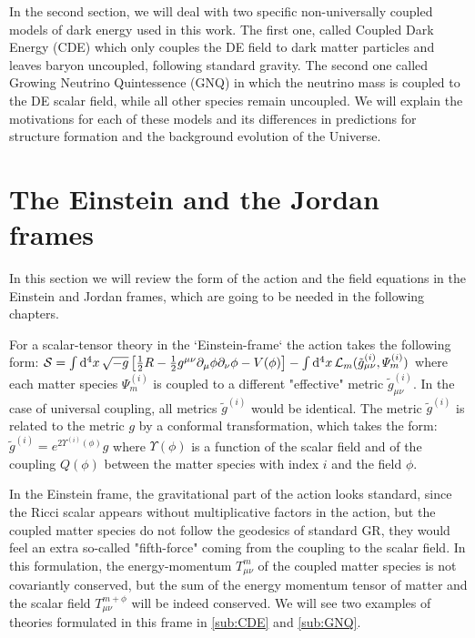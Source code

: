 In the second section, we will deal with two specific non-universally coupled models of dark energy used in this work. 
The first one,
called Coupled Dark Energy (CDE) which only couples the DE field to dark matter particles and leaves baryon uncoupled, following standard
gravity.
The second one called Growing Neutrino Quintessence (GNQ) in which the neutrino mass is coupled to the DE scalar field, while 
all other species remain uncoupled.
We will explain the motivations for each of these models and its differences in predictions for structure formation and the background evolution of the 
Universe.
 
\section{The Einstein and the Jordan frames}

In this section we will review the form of the action and the field equations in the Einstein and Jordan frames, which are going to be needed 
in the following chapters.

For a scalar-tensor theory in the `Einstein-frame` the action takes the following form:
\beeqc$\label{eq:einstein-frame-action}
\mathcal{S} = \int \mathrm{d}^{4} {x} \, \sqrt{-g} \left[  \frac{1}{2} R - \frac{1}{2} g^{\mu \nu}  \partial_{\mu}\phi \partial_{\nu}\phi 
- V(\phi)    \right] - \int \mathrm{d}^{4} {x} \, \mathcal{L}_m (\tilde{g}^{(i)}_{\mu \nu} , \varPsi_m^{(i)} )
$
where each matter species $\varPsi_m^{(i)}$ is coupled to a different "effective" metric $\tilde{g}^{(i)}_{\mu \nu}$.
In the case of universal coupling, all metrics $\tilde{g}^{(i)}$ would be identical.
The metric $\tilde{g}^{(i)}$ is related to the metric $g$ by a conformal transformation, which takes the form:
\beeqc$
\tilde{g}^{(i)} = e^{2 \Upsilon^{(i)}(\phi)} g
$
where $\Upsilon(\phi)$ is a function of the scalar field and of the coupling $Q(\phi)$ between the matter species with index $i$ and the field $\phi$.

In the Einstein frame, the gravitational part of the action looks standard, since the Ricci scalar appears without multiplicative factors in the action,
but the coupled matter species do not follow the geodesics of standard GR, 
they would feel an extra so-called "fifth-force"
coming from the coupling to the scalar field.
In this formulation, the energy-momentum $T^{m}_{\mu \nu}$ of the coupled matter species is not covariantly conserved, but
the sum of the energy momentum tensor of matter and the scalar field $T^{m+\phi}_{\mu \nu}$ will be indeed conserved.
We will see two examples of theories formulated in this frame in \cref{sub:CDE} and \cref{sub:GNQ}.

